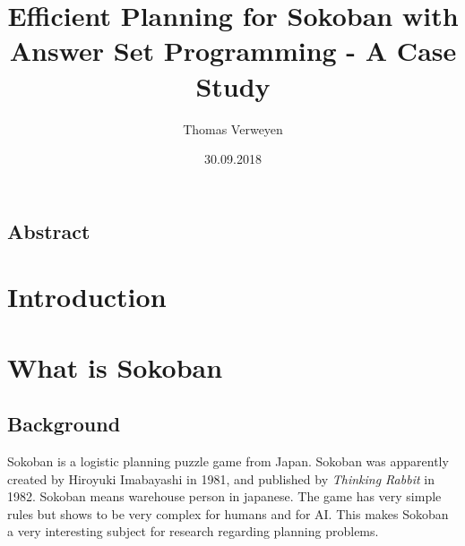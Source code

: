 \documentclass[12pt,a4paper,oneside]{report}
\title{Efficient Planning for Sokoban with Answer Set Programming - A Case Study}
\author{Thomas Verweyen}
\date{30.09.2018}
\begin{document}
\maketitle
\renewcommand*\contentsname{Table of Contents}
\tableofcontents
\section*{Abstract}
\chapter{Introduction}
\chapter{What is Sokoban}
\section{Background}
Sokoban is a logistic planning puzzle game from Japan. Sokoban was apparently created by Hiroyuki Imabayashi in 1981, and published by \textit{Thinking Rabbit} in 1982. Sokoban means warehouse person in japanese. The game has very simple rules but shows to be very complex for humans and for AI. This makes Sokoban a very interesting subject for research regarding planning problems.
\end{document}
